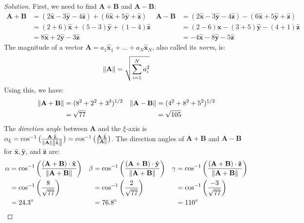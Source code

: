 \documentclass{article}
\theoremstyle{mystyle}
\begin{document}
\begin{proof}[Solution]
First, we need to find $\mathbf{A}+\mathbf{B}$ and $\mathbf{A}-\mathbf{B}$:
\begin{align*}
    \mathbf{A}+\mathbf{B}&=(2\hat{\mathbf{x}}-3\hat{\mathbf{y}}-4\hat{\mathbf{z}})+(6\hat{\mathbf{x}}+5\hat{\mathbf{y}}+\hat{\mathbf{z}})&\mathbf{A}-\mathbf{B}&=(2\hat{\mathbf{x}}-3\hat{\mathbf{y}}-4\hat{\mathbf{z}})-(6\hat{\mathbf{x}}+5\hat{\mathbf{y}}+\hat{\mathbf{z}})\\
    &=(2+6)\hat{\mathbf{x}}+(5-3)\hat{\mathbf{y}}+(1-4)\hat{\mathbf{z}} & &=(2-6)\hat{\mathbf{x}}-(3+5)\hat{\mathbf{y}}-(4+1)\hat{\mathbf{z}}\\
    &=8\hat{\mathbf{x}}+2\hat{\mathbf{y}}-3\hat{\mathbf{z}} & &=-4\hat{\mathbf{x}}-8\hat{\mathbf{y}}-5\hat{\mathbf{z}}
\end{align*}
The magnitude of a vector $\mathbf{A} = a_{1}\hat{\mathbf{x}}_{1}+\hdots+a_{N}\hat{\mathbf{x}}_{N}$, also called its \textit{norm}, is:
\begin{equation*}
    \norm{\mathbf{A}}=\sqrt{\sum_{i=1}^{N}a_{i}^{2}}
\end{equation*}
Using this, we have:
\begin{align*}
    \norm{\mathbf{A+B}} &=(8^{2}+2^{2}+3^{3})^{1/2} &\norm{\mathbf{A-B}}&=(4^{2}+8^{2}+5^{2})^{1/2}\\
    &= \sqrt{77} & &=\sqrt{105}
\end{align*}
The \textit{direction angle} between $\mathbf{A}$ and the $\xi$-axis is $\alpha_{\xi}=\cos^{-1}\big(\frac{\mathbf{A}\cdot \hat{\boldsymbol{\upxi}}}{\norm{\mathbf{A}}\norm{\hat{\boldsymbol{\upxi}}}}\big) = \cos^{-1}\big(\frac{\mathbf{A}\cdot\hat{\boldsymbol{\upxi}}}{\norm{\mathbf{A}}}\big)$. The direction angles of $\mathbf{A}+\mathbf{B}$ and $\mathbf{A}-\mathbf{B}$ for $\hat{\mathbf{x}},\hat{\mathbf{y}}$, and $\hat{\mathbf{z}}$ are:
\begin{align*}
    \alpha &=\cos^{-1}\bigg(\frac{(\mathbf{A}+\mathbf{B})\cdot\hat{\mathbf{x}}}{\norm{\mathbf{A+B}}}\bigg) &\beta &= \cos^{-1}\bigg(\frac{(\mathbf{A}+\mathbf{B})\cdot \hat{\mathbf{y}}}{\norm{\mathbf{A}+\mathbf{B}}}\bigg) &\gamma&= \cos^{-1}\bigg(\frac{(\mathbf{A}+\mathbf{B})\cdot \hat{\mathbf{z}}}{\norm{\mathbf{A}+\mathbf{B}}}\bigg)\\
    &= \cos^{-1}\bigg(\frac{8}{\sqrt{77}}\bigg) & &= \cos^{-1}\bigg(\frac{2}{\sqrt{77}}\bigg) & &= \cos^{-1}\bigg(\frac{-3}{\sqrt{77}}\bigg)\\
    &= 24.3^{\circ} & &= 76.8^{\circ} & &= 110^{\circ}
\end{align*}

\end{proof}
\end{document}
